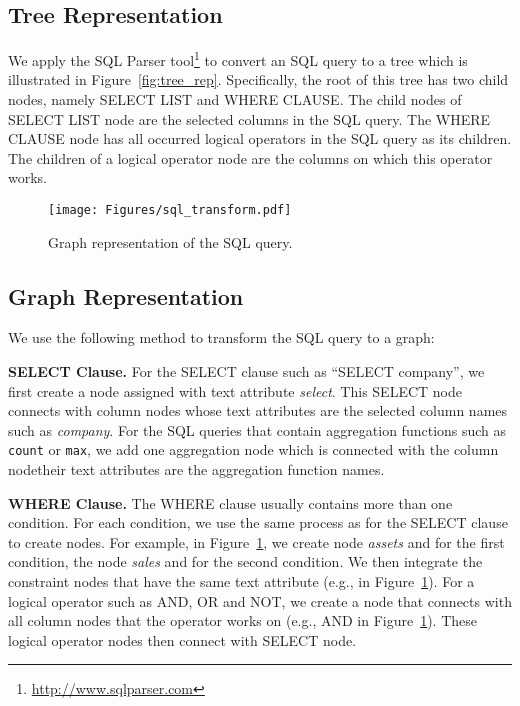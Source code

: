 \documentclass{article} \usepackage{iclr2019_conference,times}
\begin{document}
\subsection{Tree Representation}
We apply the SQL Parser tool\footnote{\url{http://www.sqlparser.com}} to convert an SQL query to a tree which is illustrated in Figure~\ref{fig:tree_rep}. Specifically, the root of this tree has two child nodes, namely SELECT LIST and WHERE CLAUSE. The child nodes of SELECT LIST node are the selected columns in the SQL query. The WHERE CLAUSE node has all occurred logical operators in the SQL query as its children. The children of a logical operator node are the columns on which this operator works. 


\begin{figure}[t!]
\centering\texttt{[image: Figures/sql\_transform.pdf]}
\caption{Graph representation of the SQL query.}
\label{fig:nlg_example_appendix}
\vspace{-0.5cm}
\end{figure}
\subsection{Graph Representation}
We use the following method to transform the SQL query to a graph:

\textbf{SELECT Clause.} For the SELECT clause such as ``SELECT company'', we first create a node assigned with text attribute \textit{select}. This SELECT node connects with column nodes whose text attributes are the selected column names such as \textit{company}.
For the SQL queries that contain aggregation functions such as \texttt{count} or \texttt{max}, we add one aggregation node which is connected with the column node\textemdash{}their text attributes are the aggregation function names.

\textbf{WHERE Clause.} The WHERE clause usually contains more than one condition.
For each condition, we use the same process as for the SELECT clause to create nodes.
For example, in Figure~\ref{fig:nlg_example_appendix}, we create node \textit{assets} and \textit{} for the first condition,
the node \textit{sales} and \textit{} for the second condition.
We then integrate the constraint nodes that have the same text attribute (e.g., \textit{} in Figure~\ref{fig:nlg_example_appendix}).
For a logical operator such as AND, OR and NOT,
we create a node that connects with all column nodes that the operator works on
(e.g., AND in Figure~\ref{fig:nlg_example_appendix}).
These logical operator nodes then connect with SELECT node.
\end{document}
